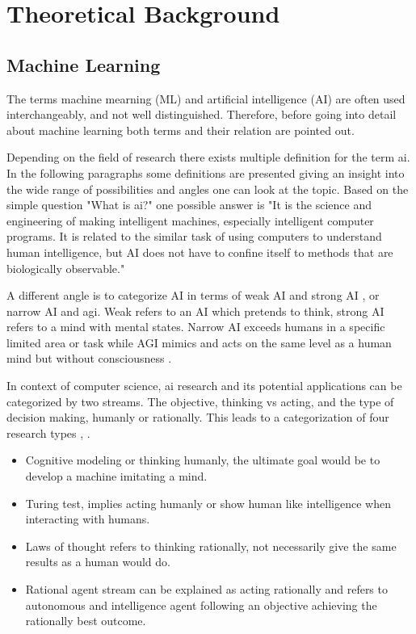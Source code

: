 \documentclass[../main.tex]{subfiles}
\begin{document}
\section{Theoretical Background} \label{sec:theory}

\subsection{Machine Learning} \label{ssec:machine_learning}

The terms machine mearning (ML) and artificial intelligence (AI) are often used interchangeably, and not well distinguished. Therefore, before going into detail about machine learning both terms and their relation are pointed out.
\newline

Depending on the field of research there exists multiple definition for the term \acs{ai}. In the following paragraphs some definitions are presented giving an insight into the wide range of possibilities and angles one can look at the topic.
Based on the simple question "What is \acs{ai}?" one possible answer is "It is the science and engineering of making intelligent machines, especially intelligent computer programs. It is related to the similar task of
using computers to understand human intelligence, but AI does not have to
confine itself to methods that are biologically observable." \cite{mccarthy_what_nodate}
\newline

A different angle is to categorize AI in terms of weak AI and strong AI \cite{kuhl_machine_2020}, or narrow AI and \ac{agi}. Weak refers to an AI which pretends to think, strong AI refers to a mind with mental states. Narrow AI exceeds humans in a specific limited area or task while AGI mimics and acts on the same level as a human mind but without consciousness \cite{kurzweil_singularity_2006}.
\newline

In context of computer science, \acs{ai} research and its potential applications can be categorized by two streams. The objective, thinking vs acting, and the type of decision making, humanly or rationally. This leads to a categorization of four research types \cite[p.~5]{russell_artificial_1995}, \cite{kuhl_machine_2020}.
\begin{itemize}
    \item Cognitive modeling or thinking humanly, the ultimate goal would be to develop a machine imitating a mind.
    \item Turing test, implies acting humanly or show human like intelligence when interacting with humans.
    \item Laws of thought refers to thinking rationally, not necessarily give the same results as a human would do.
    \item Rational agent stream can be explained as acting rationally and refers to autonomous and intelligence agent following an objective achieving the rationally best outcome.
\end{itemize}
\end{document}
